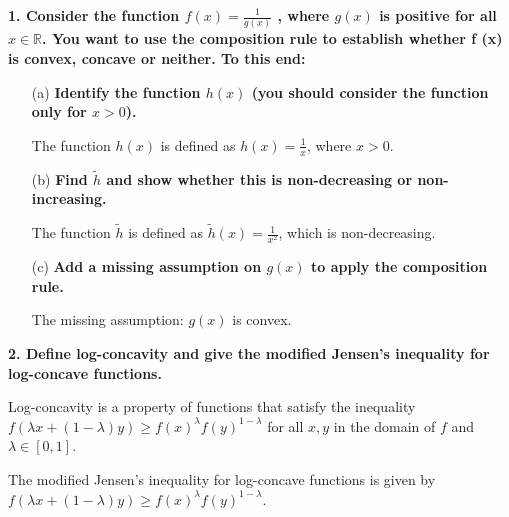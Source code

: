 \noindent\textbf{1. \; Consider the function $ f(x) = \frac{1} {g(x)}$ , where $g(x)$ is positive for all $x \in \mathbb{R}$. You want to use the composition rule to establish whether f (x) is convex, concave or neither. To this end:}
\begin{enumerate}
    \item[(a)] \textbf{Identify the function $h(x)$ (you should consider the function only for $x > 0$).}
    
    The function $h(x)$ is defined as $h(x) = \frac{1}{x}$, where $x > 0$.

    \item[(b)] \textbf{Find $\tilde{h}$ and show whether this is non-decreasing or non-increasing.}
    
    The function $\tilde{h}$ is defined as $\tilde{h}(x) = \frac{1}{x^2}$, which is non-decreasing.

    \item[(c)] \textbf{Add a missing assumption on $g(x)$ to apply the composition rule.}
    
    The missing assumption: $g(x)$ is convex.

\end{enumerate}

\noindent\textbf{2. \; Deﬁne log-concavity and give the modiﬁed Jensen's inequality for log-concave functions.}

Log-concavity is a property of functions that satisfy the inequality $f(\lambda x + (1-\lambda)y) \geq f(x)^\lambda f(y)^{1-\lambda}$ for all $x,y$ in the domain of $f$ and $\lambda \in [0,1]$.

The modified Jensen's inequality for log-concave functions is given by $f(\lambda x + (1-\lambda)y) \geq f(x)^\lambda f(y)^{1-\lambda}$.



